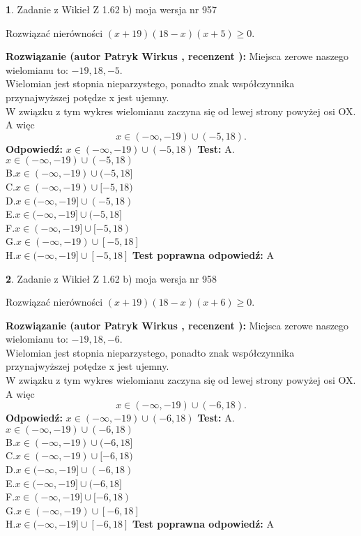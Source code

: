 \documentclass[12pt, a4paper]{article}
\theoremstyle{definition} %
\newtheorem{zad}{}
\newcommand{\zadStart}[1]{\begin{zad}#1\newline}
\newcommand{\zadStop}{\end{zad}}
\newcommand{\rozwStart}[2]{\noindent \textbf{Rozwiązanie (autor #1 , recenzent #2): }\newline}
\newcommand{\rozwStop}{\newline}
\newcommand{\odpStart}{\noindent \textbf{Odpowiedź:}\newline}
\newcommand{\odpStop}{\newline}
\newcommand{\testStart}{\noindent \textbf{Test:}\newline}
\newcommand{\testStop}{\newline}
\newcommand{\kluczStart}{\noindent \textbf{Test poprawna odpowiedź:}\newline}
\newcommand{\kluczStop}{\newline}
\begin{document}
\zadStart{Zadanie z Wikieł Z 1.62 b) moja wersja nr 957}

Rozwiązać nierówności $(x+19)(18-x)(x+5)\ge0$.
\zadStop
\rozwStart{Patryk Wirkus}{}
Miejsca zerowe naszego wielomianu to: $-19, 18, -5$.\\
Wielomian jest stopnia nieparzystego, ponadto znak współczynnika przy\linebreak najwyższej potędze x jest ujemny.\\ W związku z tym wykres wielomianu zaczyna się od lewej strony powyżej osi OX. A więc $$x \in (-\infty,-19) \cup (-5,18).$$
\rozwStop
\odpStart
$x \in (-\infty,-19) \cup (-5,18)$
\odpStop
\testStart
A.$x \in (-\infty,-19) \cup (-5,18)$\\
B.$x \in (-\infty,-19) \cup (-5,18]$\\
C.$x \in (-\infty,-19) \cup [-5,18)$\\
D.$x \in (-\infty,-19] \cup (-5,18)$\\
E.$x \in (-\infty,-19] \cup (-5,18]$\\
F.$x \in (-\infty,-19] \cup [-5,18)$\\
G.$x \in (-\infty,-19) \cup [-5,18]$\\
H.$x \in (-\infty,-19] \cup [-5,18]$
\testStop
\kluczStart
A
\kluczStop



\zadStart{Zadanie z Wikieł Z 1.62 b) moja wersja nr 958}

Rozwiązać nierówności $(x+19)(18-x)(x+6)\ge0$.
\zadStop
\rozwStart{Patryk Wirkus}{}
Miejsca zerowe naszego wielomianu to: $-19, 18, -6$.\\
Wielomian jest stopnia nieparzystego, ponadto znak współczynnika przy\linebreak najwyższej potędze x jest ujemny.\\ W związku z tym wykres wielomianu zaczyna się od lewej strony powyżej osi OX. A więc $$x \in (-\infty,-19) \cup (-6,18).$$
\rozwStop
\odpStart
$x \in (-\infty,-19) \cup (-6,18)$
\odpStop
\testStart
A.$x \in (-\infty,-19) \cup (-6,18)$\\
B.$x \in (-\infty,-19) \cup (-6,18]$\\
C.$x \in (-\infty,-19) \cup [-6,18)$\\
D.$x \in (-\infty,-19] \cup (-6,18)$\\
E.$x \in (-\infty,-19] \cup (-6,18]$\\
F.$x \in (-\infty,-19] \cup [-6,18)$\\
G.$x \in (-\infty,-19) \cup [-6,18]$\\
H.$x \in (-\infty,-19] \cup [-6,18]$
\testStop
\kluczStart
A
\kluczStop
\end{document}
